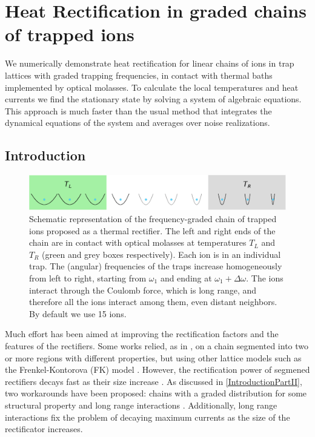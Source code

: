 
\chapter{Heat Rectification in graded chains of trapped ions}
\label{Chapter5}
%
We numerically demonstrate heat rectification for linear chains of  ions in trap lattices with  graded  trapping frequencies, in contact with
thermal baths implemented by optical molasses.  To calculate the local temperatures and heat currents we find the stationary state
by solving a system of algebraic equations. This approach is much faster than the usual method
that integrates the dynamical equations of the system and averages over noise realizations.
%
\newpage
%
\section{Introduction\label{IntroductionRectificationChainOfIons}}

\begin{figure}
    \center
    \includegraphics[width=0.75\linewidth]{Figures/Diagram.eps}
    \caption{Schematic representation  of the frequency-graded chain of trapped ions proposed as a thermal rectifier. The left and right ends of the chain are in contact with optical molasses at temperatures $T_L$ and $T_R$ (green and grey boxes respectively). Each ion is in an individual trap. The (angular) frequencies of the traps increase homogeneously from left to right, starting from $\omega_1$ and ending at $\omega_1+\Delta\omega$. The ions interact through the Coulomb force, which is long range, and therefore all the ions interact among them, even distant neighbors. By default  we use 15 ions.}
    \label{fig:Diagram}
\end{figure}

Much effort has been aimed at improving the rectification factors and the features of the rectifiers. Some works
relied, as in \cite{Terraneo2002}, on a chain segmented into two or more regions  with different properties,  but using other lattice models such as the Frenkel-Kontorova (FK) model \cite{Li2008,Hu2006}. However, the rectification power of segmened rectifiers decays fast as their size increase \cite{Hu2006}. As discussed in \ref{IntroductionPartII}, two workarounds have been proposed: chains with a graded distribution for some structural property \cite{Wang2012,Chen2015,Romero-Bastida2017,Yang2007,Romero-Bastida2013,Dettori2016,Pereira2010,Pereira2011,Avila2013} and long range interactions \cite{Chen2015,Bagchi2017,Pereira2013}. Additionally, long range interactions fix the problem of decaying maximum currents as the size of the rectificator increases.

